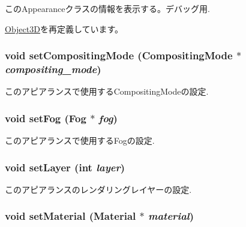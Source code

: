 このAppearanceクラスの情報を表示する。デバッグ用. 

\hyperlink{classm3g_1_1Object3D_6fea17fa1532df3794f8cb39cb4f911f}{Object3D}を再定義しています。\hypertarget{classm3g_1_1Appearance_8f9514f1c01268fff95b7c31f3a194b6}{
\subsubsection[{setCompositingMode}]{\setlength{\rightskip}{0pt plus 5cm}void setCompositingMode ({\bf CompositingMode} $\ast$ {\em compositing\_\-mode})}}
\label{classm3g_1_1Appearance_8f9514f1c01268fff95b7c31f3a194b6}


このアピアランスで使用するCompositingModeの設定. \hypertarget{classm3g_1_1Appearance_bc1a612006d6b4c3d443ff6ab542c788}{
\subsubsection[{setFog}]{\setlength{\rightskip}{0pt plus 5cm}void setFog ({\bf Fog} $\ast$ {\em fog})}}
\label{classm3g_1_1Appearance_bc1a612006d6b4c3d443ff6ab542c788}


このアピアランスで使用するFogの設定. \hypertarget{classm3g_1_1Appearance_fbd2fbd594c8ee140b028f505631f682}{
\subsubsection[{setLayer}]{\setlength{\rightskip}{0pt plus 5cm}void setLayer (int {\em layer})}}
\label{classm3g_1_1Appearance_fbd2fbd594c8ee140b028f505631f682}


このアピアランスのレンダリングレイヤーの設定. \hypertarget{classm3g_1_1Appearance_1dfd1a55fa3cc625719dab8e95c8a2de}{
\subsubsection[{setMaterial}]{\setlength{\rightskip}{0pt plus 5cm}void setMaterial ({\bf Material} $\ast$ {\em material})}}
\label{classm3g_1_1Appearance_1dfd1a55fa3cc625719dab8e95c8a2de}



